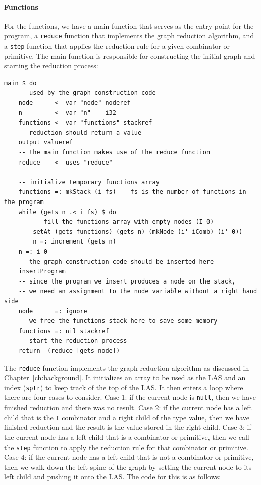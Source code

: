 \paragraph{Functions} For the functions, we have a main function that serves as the entry point for the program, a \texttt{reduce} function that implements the graph reduction algorithm, and a \texttt{step} function that applies the reduction rule for a given combinator or primitive. The main function is responsible for constructing the initial graph and starting the reduction process:
\begin{verbatim}
main $ do
    -- used by the graph construction code
    node      <- var "node" noderef
    n         <- var "n"    i32
    functions <- var "functions" stackref
    -- reduction should return a value
    output valueref
    -- the main function makes use of the reduce function
    reduce    <- uses "reduce"

    -- initialize temporary functions array
    functions =: mkStack (i fs) -- fs is the number of functions in the program
    while (gets n .< i fs) $ do
        -- fill the functions array with empty nodes (I 0)
        setAt (gets functions) (gets n) (mkNode (i' iComb) (i' 0))
        n =: increment (gets n)
    n =: i 0
    -- the graph construction code should be inserted here
    insertProgram
    -- since the program we insert produces a node on the stack,
    -- we need an assignment to the node variable without a right hand side
    node      =: ignore
    -- we free the functions stack here to save some memory
    functions =: nil stackref
    -- start the reduction process
    return_ (reduce [gets node])
\end{verbatim}
The \texttt{reduce} function implements the graph reduction algorithm as discussed in Chapter~\ref{ch:background}. It initializes an array to be used as the LAS and an index (\texttt{sptr}) to keep track of the top of the LAS. It then enters a loop where there are four cases to consider. Case 1: if the current node is \verb|null|, then we have finished reduction and there was no result. Case 2: if the current node has a left child that is the \verb|I| combinator and a right child of the type value, then we have finished reduction and the result is the value stored in the right child. Case 3: if the current node has a left child that is a combinator or primitive, then we call the \verb|step| function to apply the reduction rule for that combinator or primitive. Case 4: if the current node has a left child that is not a combinator or primitive, then we walk down the left spine of the graph by setting the current node to its left child and pushing it onto the LAS. The code for this is as follows:
